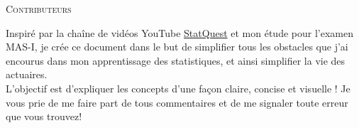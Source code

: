 \documentclass[10pt, french]{article}
\begin{document}
\begin{center}
	\textsc{\Large Contributeurs}\\[0.5cm] 
\end{center}


\begin{rappel_enhanced}[Motivation]
Inspiré par la chaîne de vidéos YouTube \href{https://www.youtube.com/user/joshstarmer}{\color{azure(colorwheel)}StatQuest} et mon étude pour l'examen MAS-I, je crée ce document dans le but de simplifier tous les obstacles que j'ai encourus dans mon apprentissage des statistiques, et ainsi simplifier la vie des actuaires.\\

L'objectif est d'expliquer les concepts d'une façon claire, concise et visuelle ! Je vous prie de me faire part de tous commentaires et de me signaler toute erreur que vous trouvez! 
\end{rappel_enhanced}
\end{document}
